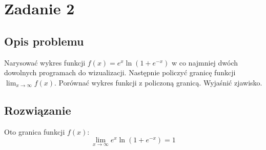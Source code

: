 
\section{Zadanie 2}
\subsection{Opis problemu}
Narysować wykres funkcji $ f(x) = e^x \ln (1 + e^{-x}) $ w co najmniej dwóch dowolnych programach do wizualizacji. Następnie policzyć granicę funkcji $ \lim_{x \to \infty} f(x) $. Porównać
wykres funkcji z policzoną granicą. Wyjaśnić zjawisko.
\subsection{Rozwiązanie}
Oto granica funkcji $ f(x) $:
$$ \lim_{x \to \infty} e^x \ln (1 + e^{-x}) = 1$$
